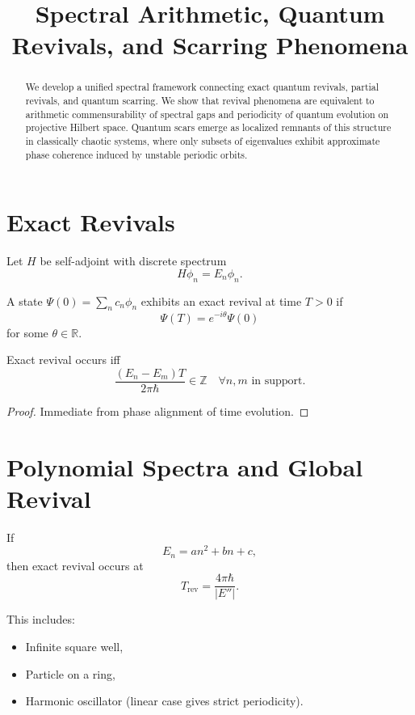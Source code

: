 \documentclass[11pt]{article}
\title{Spectral Arithmetic, Quantum Revivals, and Scarring Phenomena}
\author{}
\date{}
\begin{document}
\maketitle

\begin{abstract}
We develop a unified spectral framework connecting exact quantum revivals, partial revivals, and quantum scarring. 
We show that revival phenomena are equivalent to arithmetic commensurability of spectral gaps and periodicity of quantum evolution on projective Hilbert space. 
Quantum scars emerge as localized remnants of this structure in classically chaotic systems, where only subsets of eigenvalues exhibit approximate phase coherence induced by unstable periodic orbits.
\end{abstract}

\section{Exact Revivals}

Let $H$ be self-adjoint with discrete spectrum
\[
H\phi_n = E_n \phi_n.
\]

\begin{definition}
A state $\Psi(0)=\sum_n c_n\phi_n$ exhibits an exact revival at time $T>0$ if
\[
\Psi(T)=e^{-i\theta}\Psi(0)
\]
for some $\theta\in\mathbb{R}$.
\end{definition}

\begin{theorem}
Exact revival occurs iff
\[
\frac{(E_n-E_m)T}{2\pi\hbar}\in\mathbb{Z}
\quad
\forall n,m \text{ in support}.
\]
\end{theorem}

\begin{proof}
Immediate from phase alignment of time evolution.
\end{proof}

\section{Polynomial Spectra and Global Revival}

If
\[
E_n = a n^2 + b n + c,
\]
then exact revival occurs at
\[
T_{\mathrm{rev}} = \frac{4\pi\hbar}{|E''|}.
\]

This includes:
\begin{itemize}
\item Infinite square well,
\item Particle on a ring,
\item Harmonic oscillator (linear case gives strict periodicity).
\end{itemize}
\end{document}

